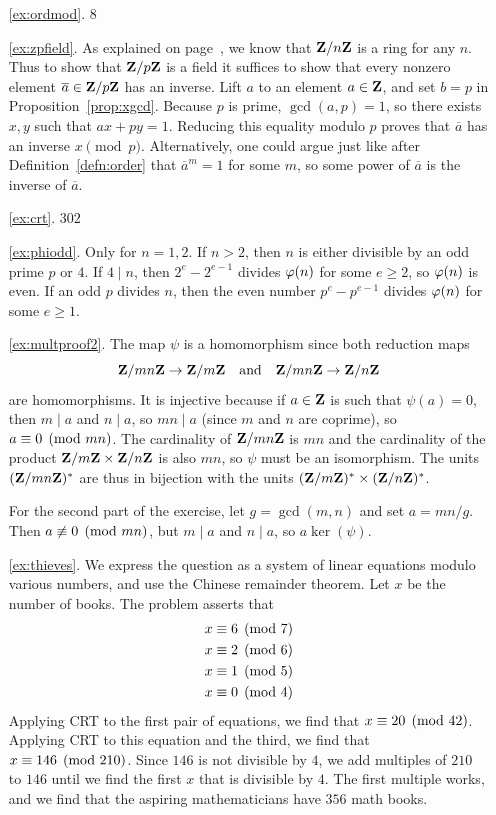 \begin{itemize}
\begin{enumerate}
\item[\ref{ex:ordmod}.] $8$

\item[\ref{ex:zpfield}.] As explained on page~\pageref{page:znring},
we know that $\mathbf{Z}/n\mathbf{Z}{}$ is a ring for any $n$.  Thus to show that
$\mathbf{Z}/p\mathbf{Z}{}$ is a field it suffices to show that every nonzero element
$\overline{a}\in\mathbf{Z}/p\mathbf{Z}{}$ has an inverse.  Lift $a$ to an element $a\in\mathbf{Z}$,
and set $b=p$ in Proposition~\ref{prop:xgcd}.   Because $p$ is prime,
$\gcd(a,p)=1$, so there exists $x,y$ such that $ax + py = 1$.
Reducing this equality modulo $p$ proves that $\overline{a}$ has
an inverse $x\pmod{p}$.  Alternatively, one could argue just
like after Definition~\ref{defn:order} that $\overline{a}^m=1$
for some $m$, so some power of $\overline{a}$ is the
inverse of $\overline{a}$.

\item[\ref{ex:crt}.] $302$

\item[\ref{ex:phiodd}.] Only for $n=1,2$.  If $n>2$, then
$n$ is either divisible by an odd prime $p$ or $4$.  If $4\mid n$,
then $2^e-2^{e-1}$ divides $\varphi(n)$ for some $e\geq 2$, so $\varphi(n)$
is even.  If an odd $p$ divides $n$, then the even number
$p^e-p^{e-1}$ divides $\varphi(n)$ for some $e\geq 1$.

\item[\ref{ex:multproof2}.]  The map $\psi$ is a homomorphism since
both reduction maps $$\mathbf{Z}/mn\mathbf{Z}{}\to \mathbf{Z}/m\mathbf{Z}{}\quad\text{and}\quad
\mathbf{Z}/mn\mathbf{Z}{}\to \mathbf{Z}/n\mathbf{Z}{}$$
are homomorphisms.  It is injective because if $a\in\mathbf{Z}$ is such
that $\psi(a)=0$, then $m\mid a$ and $n\mid a$, so $mn\mid a$ (since
$m$ and $n$ are coprime), so $a\equiv 0\pmod{mn}$.
The cardinality of $\mathbf{Z}/mn\mathbf{Z}{}$ is $mn$ and the cardinality of
the product $\mathbf{Z}/m\mathbf{Z}{}\times \mathbf{Z}/n\mathbf{Z}{}$ is also $mn$, so $\psi$
must be an isomorphism.  The units $(\mathbf{Z}/mn\mathbf{Z}{})^*$ are thus
in bijection with the units $(\mathbf{Z}/m\mathbf{Z}{})^*\times (\mathbf{Z}/n\mathbf{Z}{})^*$.

For the second part of the exercise, let $g=\gcd(m,n)$ and
set $a=mn/g$.  Then $a\not\equiv 0\pmod{mn}$, but $m\mid a$ and
$n\mid a$, so $a\ker(\psi)$.

\item[\ref{ex:thieves}.] We express the question as a
system of linear equations modulo various numbers, and use the Chinese
remainder theorem.    Let $x$ be the number of books.
The problem asserts that
\begin{align*}
x&\equiv 6\pmod{7}\\
x&\equiv 2\pmod{6}\\
x&\equiv 1\pmod{5}\\
x&\equiv 0\pmod{4}
\end{align*}
Applying CRT to the first pair of equations, we find that
$x\equiv 20\pmod{42}$.  Applying CRT to this equation and
the third, we find that $x\equiv 146\pmod{210}$.  Since $146$
is not divisible by $4$, we add multiples of $210$ to $146$
until we find the first $x$ that is divisible by $4$.  The first multiple
works, and we find that the aspiring mathematicians
have $356$ math books.


\end{enumerate}
\end{itemize}
